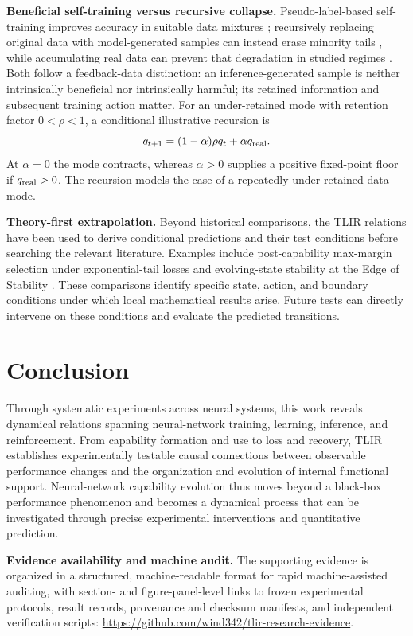 \documentclass[10pt,twocolumn,letterpaper]{article}
\begin{document}
\noindent\textbf{Beneficial self-training versus recursive collapse.}
Pseudo-label-based self-training improves accuracy in suitable data mixtures \cite{xie2020}; recursively replacing original data with model-generated samples can instead erase minority tails \cite{shumailov2024}, while accumulating real data can prevent that degradation in studied regimes \cite{gerstgrasser2024}. Both follow a feedback-data distinction: an inference-generated sample is neither intrinsically beneficial nor intrinsically harmful; its retained information and subsequent training action matter. For an under-retained mode with retention factor $0<\rho<1$, a conditional illustrative recursion is
\begin{equation}
 q_{t+1}=(1-\alpha)\rho q_t+\alpha q_{\rm real}.
 \label{eq:feedback}
\end{equation}
At $\alpha=0$ the mode contracts, whereas $\alpha>0$ supplies a positive fixed-point floor if $q_{\rm real}>0$. The recursion models the case of a repeatedly under-retained data mode.

\noindent\textbf{Theory-first extrapolation.}
Beyond historical comparisons, the TLIR relations have been used to derive conditional predictions and their test conditions before searching the relevant literature. Examples include post-capability max-margin selection under exponential-tail losses \cite{soudry2018} and evolving-state stability at the Edge of Stability \cite{cohen2021}. These comparisons identify specific state, action, and boundary conditions under which local mathematical results arise. Future tests can directly intervene on these conditions and evaluate the predicted transitions.

\section{Conclusion}
Through systematic experiments across neural systems, this work reveals dynamical relations spanning neural-network training, learning, inference, and reinforcement. From capability formation and use to loss and recovery, TLIR establishes experimentally testable causal connections between observable performance changes and the organization and evolution of internal functional support. Neural-network capability evolution thus moves beyond a black-box performance phenomenon and becomes a dynamical process that can be investigated through precise experimental interventions and quantitative prediction.

\noindent\textbf{Evidence availability and machine audit.}
The supporting evidence is organized in a structured, machine-readable format for rapid machine-assisted auditing, with section- and figure-panel-level links to frozen experimental protocols, result records, provenance and checksum manifests, and independent verification scripts: \url{https://github.com/wind342/tlir-research-evidence}.
\end{document}
